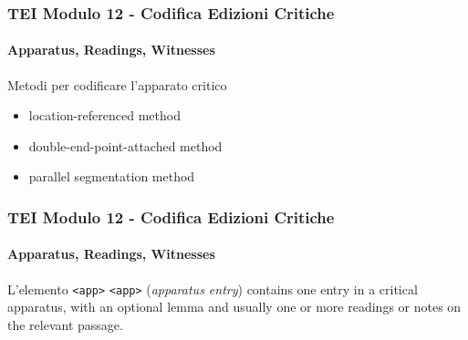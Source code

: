 \begin{frame}
    \frametitle{TEI Modulo 12 - Codifica Edizioni Critiche}
    \framesubtitle{Apparatus, Readings, Witnesses}
    \addtocounter{nframe}{1}


    \begin{block}{Metodi per codificare l'apparato critico}
        \begin{itemize}
            \item location-referenced method
            \item double-end-point-attached method
            \item parallel segmentation method
        \end{itemize}

       
    \end{block}


\end{frame}


\begin{frame}
    \frametitle{TEI Modulo 12 - Codifica Edizioni Critiche}
    \framesubtitle{Apparatus, Readings, Witnesses}
    \addtocounter{nframe}{1}












    \begin{block}{L'elemento \texttt{<app>}}
        \texttt{<app>} (\textit{apparatus entry}) contains one entry in a critical apparatus, with an optional lemma and usually one or more readings or notes on the relevant passage.
    \end{block}

\end{frame}

